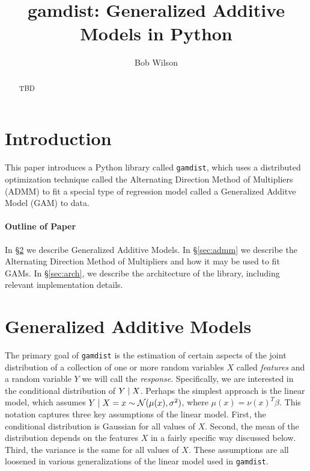 \documentclass[12pt]{article}
\title{gamdist: Generalized Additive Models in Python}
\author{Bob Wilson}
\begin{document}
\maketitle

\begin{abstract}
TBD
\end{abstract}

\newpage
\tableofcontents
\newpage

\section{Introduction}
This paper introduces a Python library called \texttt{gamdist}, which uses a distributed optimization technique called the Alternating Direction Method of Multipliers (ADMM) to fit a special type of regression model called a Generalized Additve Model (GAM)  to data. 

\paragraph{Outline of Paper} In \S\ref{sec:gam} we describe Generalized Additive Models. In \S\ref{sec:admm} we describe the Alternating Direction Method of Multipliers and how it may be used to fit GAMs. In \S\ref{sec:arch}, we describe the architecture of the library, including relevant implementation details.

\section{Generalized Additive Models}
\label{sec:gam}

The primary goal of \texttt{gamdist} is the estimation of certain aspects of the joint distribution of a collection of one or more random variables $X$ called \textit{features} and a random variable $Y$ we will call the \textit{response}. Specifically, we are interested in the conditional distribution of $Y \; | \; X$. Perhaps the simplest approach is the linear model, which assumes $Y \; | \; X = x \sim {\mathcal N} (\mu(x), \sigma^2)$, where $\mu(x) = \nu(x)^T \beta$. This notation captures three key assumptions of the linear model. First, the conditional distribution is Gaussian for all values of $X$. Second, the mean of the distribution depends on the features $X$ in a fairly specific way discussed below. Third, the variance is the same for all values of $X$. These assumptions are all loosened in various generalizations of the linear model used in \texttt{gamdist}.
\end{document}
